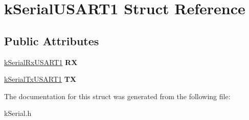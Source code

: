 \hypertarget{structkSerialUSART1}{}\section{k\+Serial\+U\+S\+A\+R\+T1 Struct Reference}
\label{structkSerialUSART1}
\subsection*{Public Attributes}
\begin{DoxyCompactItemize}
\item 
\hyperlink{structkSerialRxUSART1}{k\+Serial\+Rx\+U\+S\+A\+R\+T1} {\bfseries RX}\hypertarget{structkSerialUSART1_a738e35e4794b3a7f87c07e7cefb06bc9}{}\label{structkSerialUSART1_a738e35e4794b3a7f87c07e7cefb06bc9}

\item 
\hyperlink{structkSerialTxUSART1}{k\+Serial\+Tx\+U\+S\+A\+R\+T1} {\bfseries TX}\hypertarget{structkSerialUSART1_a090e8d8e3e102abcc7f43f4f7c5c9fb8}{}\label{structkSerialUSART1_a090e8d8e3e102abcc7f43f4f7c5c9fb8}

\end{DoxyCompactItemize}


The documentation for this struct was generated from the following file\+:\begin{DoxyCompactItemize}
\item 
k\+Serial.\+h\end{DoxyCompactItemize}
